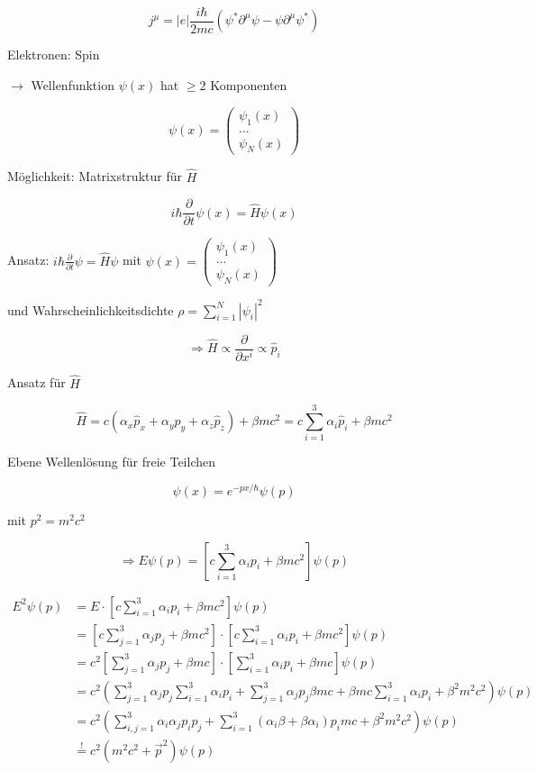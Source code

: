 \[ j^\mu = |e|\frac{i\hbar}{2mc} (\psi^*\partial^\mu\psi -\psi\partial^\mu\psi^* )\]


Elektronen: Spin

\(\rightarrow \) Wellenfunktion \(\psi(x)\) hat \(\geq 2\) Komponenten

\[\psi(x) =\begin{pmatrix} \psi_1(x)\\ ...\\ \psi_N(x) \end{pmatrix} \]

Möglichkeit: Matrixstruktur für \(\hat H\)

\[i\hbar \frac{\partial}{\partial t}\psi(x) = \hat H \psi(x)\]




Ansatz: \(i\hbar \frac{\partial }{\partial t} \psi = \hat H \psi\) mit \(\psi(x) =\begin{pmatrix} \psi_1(x)\\ ...\\ \psi_N(x) \end{pmatrix} \)

und Wahrscheinlichkeitsdichte \(\rho = \sum_{i=1}^N |\psi_i|^2\)

\[\Rightarrow \hat H \propto \frac{\partial}{\partial x^i}\propto \hat p_i\]

Ansatz für \(\hat H\)

\[\hat H = c(\alpha_x\hat p_x+\alpha_y\hat p_y+\alpha_z\hat p_z) +\beta mc^2 = c\sum_{i=1}^3 \alpha_i\hat p_i+ \beta mc^2\]

Ebene Wellenlösung für freie Teilchen

\[\psi(x) = e^{-px/\hbar}\psi(p)\]

mit \(p^2 = m^2c^2\)

\[\Rightarrow  E\psi(p) =[c \sum_{i=1}^3 \alpha_ip_i+\beta mc^2]\psi(p)\]

\begin{align}
E^2\psi(p) &=E\cdot [c \sum_{i=1}^3 \alpha_ip_i+\beta mc^2]\psi(p)\\
&=[c \sum_{j=1}^3 \alpha_jp_j+\beta mc^2] \cdot [c \sum_{i=1}^3 \alpha_ip_i+\beta mc^2]\psi(p) \\
&=c^2 [ \sum_{j=1}^3 \alpha_jp_j+\beta mc] \cdot [ \sum_{i=1}^3 \alpha_ip_i+\beta mc]\psi(p) \\
&=c^2 \left( \sum_{j=1}^3 \alpha_jp_j\sum_{i=1}^3 \alpha_ip_i  +   \sum_{j=1}^3 \alpha_jp_j \beta mc  + \beta mc \sum_{i=1}^3 \alpha_ip_i+ \beta^2 m^2c^2\right)\psi(p) \\
&= c^2\left(\sum_{i,j=1}^3\alpha_i\alpha_j p_ip_j+\sum_{i=1}^3(\alpha_i\beta+\beta\alpha_i)p_i mc +  \beta^2m^2c^2\right)\psi(p)\\
&\stackrel{\mathrm{!}}= c^2 (m^2c^2+\vec p^2 )\psi(p)
\end{align}



